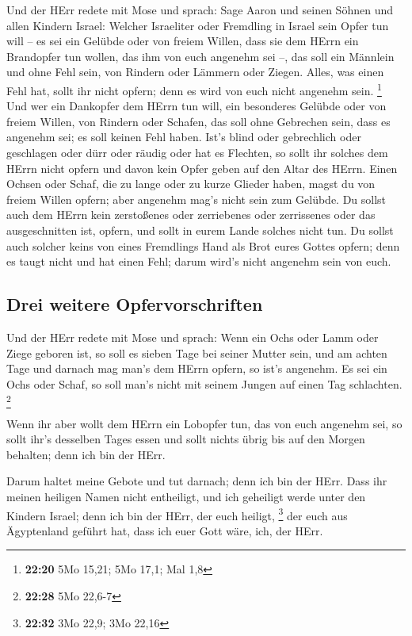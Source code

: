  Und der HErr redete mit Mose und sprach: 
Sage Aaron und seinen Söhnen und allen Kindern Israel: Welcher
Israeliter oder Fremdling in Israel sein Opfer tun will -- es sei ein
Gelübde oder von freiem Willen, dass sie dem HErrn ein Brandopfer tun
wollen, das ihm von euch angenehm sei --,  das soll ein
Männlein und ohne Fehl sein, von Rindern oder Lämmern oder Ziegen.
 Alles, was einen Fehl hat, sollt ihr nicht opfern; denn
es wird von euch nicht angenehm sein. \footnote{\textbf{22:20} 5Mo
  15,21; 5Mo 17,1; Mal 1,8}  Und wer ein Dankopfer dem
HErrn tun will, ein besonderes Gelübde oder von freiem Willen, von
Rindern oder Schafen, das soll ohne Gebrechen sein, dass es angenehm
sei; es soll keinen Fehl haben.  Ist's blind oder
gebrechlich oder geschlagen oder dürr oder räudig oder hat es Flechten,
so sollt ihr solches dem HErrn nicht opfern und davon kein Opfer geben
auf den Altar des HErrn.  Einen Ochsen oder Schaf, die zu
lange oder zu kurze Glieder haben, magst du von freiem Willen opfern;
aber angenehm mag's nicht sein zum Gelübde.  Du sollst
auch dem HErrn kein zerstoßenes oder zerriebenes oder zerrissenes oder
das ausgeschnitten ist, opfern, und sollt in eurem Lande solches nicht
tun.  Du sollst auch solcher keins von eines Fremdlings
Hand als Brot eures Gottes opfern; denn es taugt nicht und hat einen
Fehl; darum wird's nicht angenehm sein von euch.

\hypertarget{drei-weitere-opfervorschriften}{%
\subsection{Drei weitere
Opfervorschriften}\label{drei-weitere-opfervorschriften}}

 Und der HErr redete mit Mose und sprach: 
Wenn ein Ochs oder Lamm oder Ziege geboren ist, so soll es sieben Tage
bei seiner Mutter sein, und am achten Tage und darnach mag man's dem
HErrn opfern, so ist's angenehm.  Es sei ein Ochs oder
Schaf, so soll man's nicht mit seinem Jungen auf einen Tag schlachten.
\footnote{\textbf{22:28} 5Mo 22,6-7}

 Wenn ihr aber wollt dem HErrn ein Lobopfer tun, das von
euch angenehm sei,  so sollt ihr's desselben Tages essen
und sollt nichts übrig bis auf den Morgen behalten; denn ich bin der
HErr.

 Darum haltet meine Gebote und tut darnach; denn ich bin
der HErr.  Dass ihr meinen heiligen Namen nicht
entheiligt, und ich geheiligt werde unter den Kindern Israel; denn ich
bin der HErr, der euch heiligt, \footnote{\textbf{22:32} 3Mo 22,9; 3Mo
  22,16}  der euch aus Ägyptenland geführt hat, dass ich
euer Gott wäre, ich, der HErr.


